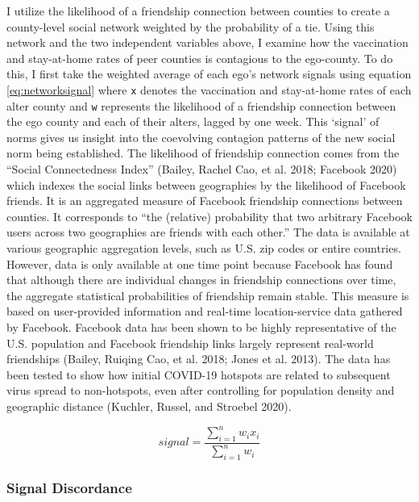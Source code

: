 I utilize the likelihood of a friendship connection between counties
to create a county-level social network weighted by the probability of a tie.
Using this network and the two independent variables above, I examine how the
vaccination and stay-at-home rates of peer counties is contagious to the
ego-county. To do this, I first take the weighted average of each ego's network
signals using equation \eqref{eq:networksignal} where \texttt{x} denotes the
vaccination and stay-at-home rates of each alter county and \texttt{w} represents the
likelihood of a friendship connection between the ego county and each of their
alters, lagged by one week. This `signal' of norms gives us insight into the
coevolving contagion patterns of the new social norm being established. The
likelihood of friendship connection comes from the ``Social Connectedness Index''
(Bailey, Rachel Cao, et al. 2018; Facebook 2020) which indexes the social links between geographies by
the likelihood of Facebook friends. It is an aggregated measure of Facebook
friendship connections between counties. It corresponds to ``the (relative)
probability that two arbitrary Facebook users across two geographies are friends
with each other.'' The data is available at various geographic aggregation
levels, such as U.S. zip codes or entire countries. However, data is only
available at one time point because Facebook has found that although there are
individual changes in friendship connections over time, the aggregate
statistical probabilities of friendship remain stable. This measure is based on
user-provided information and real-time location-service data gathered by
Facebook. Facebook data has been shown to be highly representative of the U.S.
population and Facebook friendship links largely represent real-world
friendships (Bailey, Ruiqing Cao, et al. 2018; Jones et al. 2013). The data has been tested to show
how initial COVID-19 hotspots are related to subsequent virus spread to
non-hotspots, even after controlling for population density and geographic
distance (Kuchler, Russel, and Stroebel 2020).

\begin{equation}
signal = \frac{\sum_{i=1}^nw_ix_i}{\sum^n_{i=1}w_i} \label{eq:networksignal}
\end{equation}

\hypertarget{signal-discordance}{%
\subsubsection{Signal Discordance}\label{signal-discordance}}

